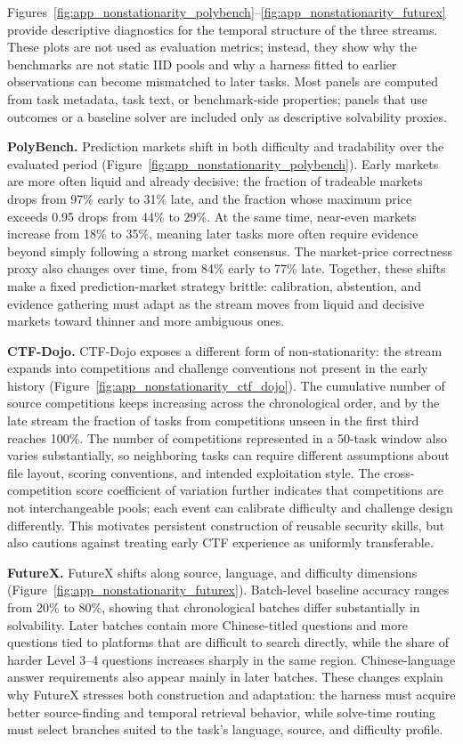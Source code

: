 Figures~\ref{fig:app_nonstationarity_polybench}--\ref{fig:app_nonstationarity_futurex} provide descriptive diagnostics for the temporal structure of the three streams. These plots are not used as evaluation metrics; instead, they show why the benchmarks are not static IID pools and why a harness fitted to earlier observations can become mismatched to later tasks. Most panels are computed from task metadata, task text, or benchmark-side properties; panels that use outcomes or a baseline solver are included only as descriptive solvability proxies.

\noindent\textbf{PolyBench.}
Prediction markets shift in both difficulty and tradability over the evaluated period (Figure~\ref{fig:app_nonstationarity_polybench}). Early markets are more often liquid and already decisive: the fraction of tradeable markets drops from 97\% early to 31\% late, and the fraction whose maximum price exceeds 0.95 drops from 44\% to 29\%. At the same time, near-even markets increase from 18\% to 35\%, meaning later tasks more often require evidence beyond simply following a strong market consensus. The market-price correctness proxy also changes over time, from 84\% early to 77\% late. Together, these shifts make a fixed prediction-market strategy brittle: calibration, abstention, and evidence gathering must adapt as the stream moves from liquid and decisive markets toward thinner and more ambiguous ones.

\noindent\textbf{CTF-Dojo.}
CTF-Dojo exposes a different form of non-stationarity: the stream expands into competitions and challenge conventions not present in the early history (Figure~\ref{fig:app_nonstationarity_ctf_dojo}). The cumulative number of source competitions keeps increasing across the chronological order, and by the late stream the fraction of tasks from competitions unseen in the first third reaches 100\%. The number of competitions represented in a 50-task window also varies substantially, so neighboring tasks can require different assumptions about file layout, scoring conventions, and intended exploitation style. The cross-competition score coefficient of variation further indicates that competitions are not interchangeable pools; each event can calibrate difficulty and challenge design differently. This motivates persistent construction of reusable security skills, but also cautions against treating early CTF experience as uniformly transferable.

\noindent\textbf{FutureX.}
FutureX shifts along source, language, and difficulty dimensions (Figure~\ref{fig:app_nonstationarity_futurex}). Batch-level baseline accuracy ranges from 20\% to 80\%, showing that chronological batches differ substantially in solvability. Later batches contain more Chinese-titled questions and more questions tied to platforms that are difficult to search directly, while the share of harder Level 3--4 questions increases sharply in the same region. Chinese-language answer requirements also appear mainly in later batches. These changes explain why FutureX stresses both construction and adaptation: the harness must acquire better source-finding and temporal retrieval behavior, while solve-time routing must select branches suited to the task's language, source, and difficulty profile.


